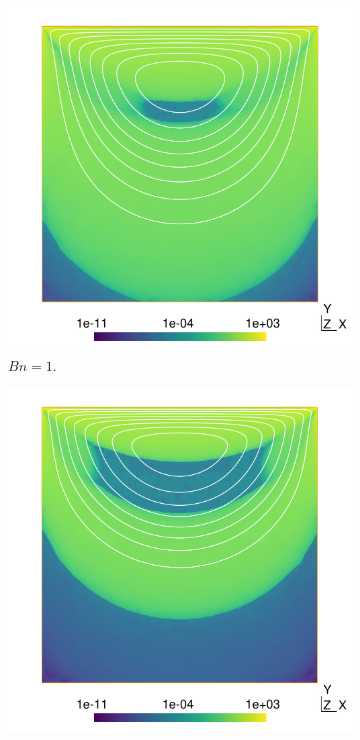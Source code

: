 \documentclass[11 pt]{report}
\begin{document}
\begin{figure}[t]
\begin{subfigure}[t]{0.495\textwidth}
        \includegraphics[width=\textwidth]{../figures/cavity_1.pdf}
        \caption{$Bn=1$.}
        \label{fig:cavity1}
    \end{subfigure}
    \begin{subfigure}[t]{0.495\textwidth}
        \includegraphics[width=\textwidth]{../figures/cavity_5.pdf}

\end{subfigure}
\end{figure}
\end{document}
